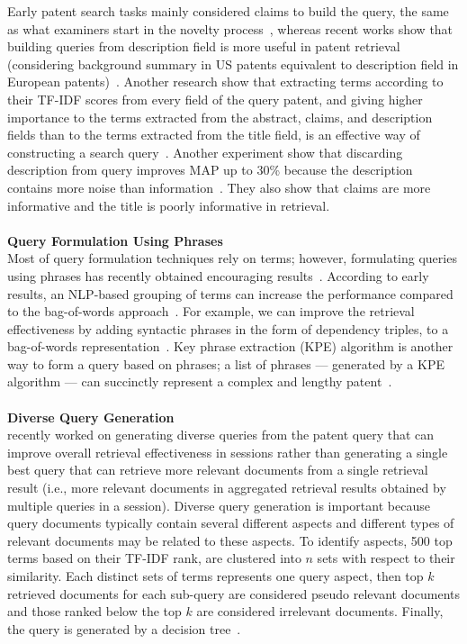 Early patent search tasks mainly considered claims to build the query, the same as what examiners start in the novelty process~\citep{konishi2005query, takaki2004associative, mase2005proposal, fujii2007enhancing}, whereas recent works show that building queries from description field is more useful in patent retrieval (considering background summary in US patents equivalent to description field in European patents)~\citep{xue2009transforming, xue2009automatic, mahdabi2011building}. Another research show that extracting terms according to their TF-IDF scores from every field of the query patent, and giving higher importance to the terms extracted from the abstract, claims, and description fields than to the terms extracted from the title field, is an effective way of constructing a search query~\citep{cetintas2012effective}. Another experiment show that discarding description from query improves MAP up to 30\% because the description contains more noise than information~\citep{gobeill2010simple}. They also show that claims are more informative and the title is poorly informative in retrieval.   
\\\\
\textbf{Query Formulation Using Phrases}
\ \\
Most of query formulation techniques rely on terms; however, formulating queries using phrases has recently obtained encouraging results~\citep{becks2010phrases}. According to early results, an NLP-based grouping of terms can increase the performance compared to the bag-of-words approach~\citep{osborn1997evaluating}. For example, we can improve the retrieval effectiveness by adding syntactic phrases in the form of dependency triples, to a bag-of-words representation~\citep{d2011combining}. Key phrase extraction (KPE) algorithm is another way to form a query based on phrases; a list of phrases --- generated by a KPE algorithm --- can succinctly represent a complex and lengthy patent~\citep{verma2011applying}.
\\\\
\textbf{Diverse Query Generation}
\ \\
\cite{kim2014diversifying} recently worked on generating diverse queries from the patent query that can improve overall retrieval effectiveness in sessions rather than generating a single best query that can retrieve more relevant documents from a single retrieval result (i.e., more relevant documents in aggregated retrieval results obtained by multiple queries in a session). Diverse query generation is important because query documents typically contain several different aspects and different types of relevant documents may be related to these aspects. To identify aspects, 500 top terms based on their TF-IDF rank, are clustered into $ n $ sets with respect to their similarity. Each distinct sets of terms represents one query aspect, then top $ k $ retrieved documents for each sub-query are considered pseudo relevant documents and those ranked below the top $ k $ are considered irrelevant documents. Finally, the query is generated by a decision tree~\citep{kim2014searching, kim2014diversifying}.